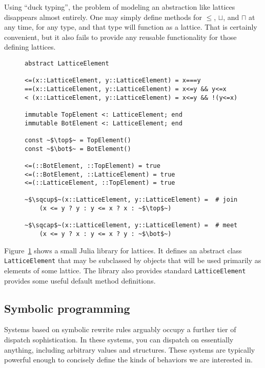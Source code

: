 Using ``duck typing'', the problem of modeling an abstraction like lattices
disappears almost entirely. One may simply define methods for
$\leq$, $\sqcup$, and $\sqcap$ at any time, for any type, and that type will
function as a lattice. That is certainly convenient, but it also fails to
provide any reusable functionality for those defining lattices.

\begin{figure}
  \label{julialattices}
  \begin{center}
\begin{singlespace}
\begin{lstlisting}[style=customjulia]
abstract LatticeElement

<=(x::LatticeElement, y::LatticeElement) = x===y
==(x::LatticeElement, y::LatticeElement) = x<=y && y<=x
< (x::LatticeElement, y::LatticeElement) = x<=y && !(y<=x)

immutable TopElement <: LatticeElement; end
immutable BotElement <: LatticeElement; end

const ~$\top$~ = TopElement()
const ~$\bot$~ = BotElement()

<=(::BotElement, ::TopElement) = true
<=(::BotElement, ::LatticeElement) = true
<=(::LatticeElement, ::TopElement) = true

~$\sqcup$~(x::LatticeElement, y::LatticeElement) =  # join
    (x <= y ? y : y <= x ? x : ~$\top$~)

~$\sqcap$~(x::LatticeElement, y::LatticeElement) =  # meet
    (x <= y ? x : y <= x ? y : ~$\bot$~)
\end{lstlisting}
\end{singlespace}
  \end{center}
\end{figure}

Figure~\ref{julialattices} shows a small Julia library for lattices.
It defines an abstract class \texttt{LatticeElement} that may be subclassed
by objects that will be used primarily as elements of some lattice.
The library also provides standard
\texttt{LatticeElement} provides some useful default method definitions.


\subsection{Symbolic programming}

Systems based on symbolic rewrite rules arguably occupy a further tier of
dispatch sophistication. In these systems, you can dispatch on essentially
anything, including arbitrary values and structures. These systems are
typically powerful enough to concisely define the kinds of behaviors we
are interested in.

